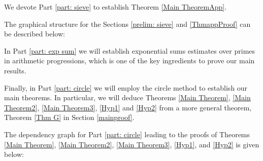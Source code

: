 \documentclass[12pt]{amsart}
\numberwithin{equation}{section}
\theoremstyle{remark}
\theoremstyle{definition}
\begin{document}
We devote Part \ref{part: sieve} to establish Theorem \ref{Main TheoremApp}. %


The graphical structure for the Sections \ref{prelim: sieve} and \ref{ThmappProof} can be described below:
\medskip

\begin{center}

\end{center}


\medskip

In Part \ref{part: exp sum} we will establish exponential sums estimates over primes in arithmetic progressions, which is one of the key ingredients to prove our main results.

Finally, in Part \ref{part: circle} we will employ the circle method to establish our main theorems. In particular, we will deduce Theorems \ref{Main Theorem}, \ref{Main Theorem2}, \ref{Main Theorem3}, \ref{Hyp1} and \ref{Hyp2} from a more general theorem, Theorem \ref{Thm G} in Section \ref{mainproof}.


The dependency graph for Part \ref{part: circle} leading to the proofs of Theorems \ref{Main Theorem}, \ref{Main Theorem2}, \ref{Main Theorem3}, \ref{Hyp1}, and \ref{Hyp2} is given below:


\end{document}
